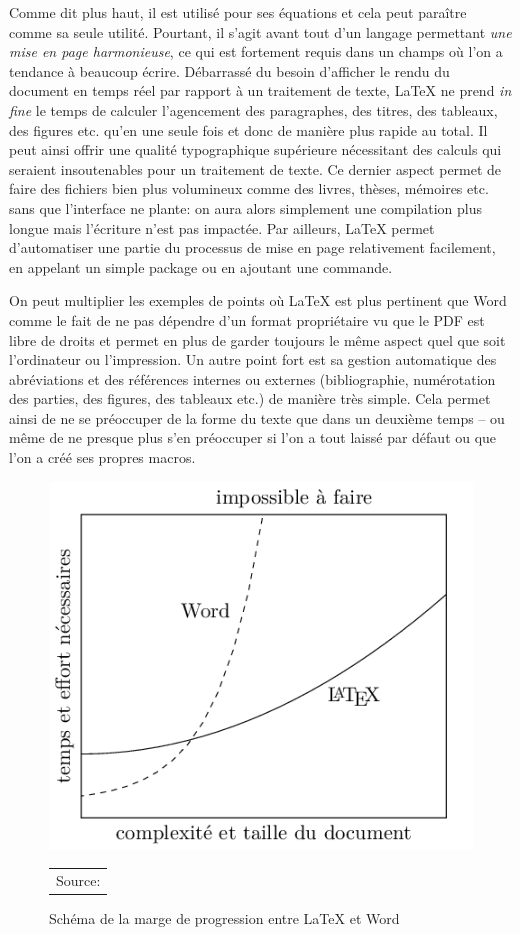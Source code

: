 \documentclass[a4paper, 11pt]{article}\usepackage[]{graphicx}\usepackage[]{xcolor}
\begin{document}
Comme dit plus haut, il est utilisé pour ses équations et cela peut paraître comme sa seule utilité. Pourtant, il s'agit avant tout d'un langage permettant \emph{une mise en page harmonieuse}, ce qui est fortement requis dans un champs où l'on a tendance à beaucoup écrire. Débarrassé du besoin d'afficher le rendu du document en temps réel par rapport à un traitement de texte, \LaTeX{} ne prend \emph{in fine} le temps de calculer l'agencement des paragraphes, des titres, des tableaux, des figures etc. qu'en une seule fois et donc de manière plus rapide au total. Il peut ainsi offrir une qualité typographique supérieure nécessitant des calculs qui seraient insoutenables pour un traitement de texte. Ce dernier aspect permet de faire des fichiers bien plus volumineux comme des livres, thèses, mémoires etc. sans que l'interface ne plante: on aura alors simplement une compilation plus longue mais l'écriture n'est pas impactée. Par ailleurs, \LaTeX{} permet d'automatiser une partie du processus de mise en page relativement facilement, en appelant un simple package ou en ajoutant une commande.

On peut multiplier les exemples de points où \LaTeX{} est plus pertinent que Word comme le fait de ne pas dépendre d'un format propriétaire vu que le PDF est libre de droits et permet en plus de garder toujours le même aspect quel que soit l'ordinateur ou l'impression. Un autre point fort est sa gestion automatique des abréviations et des références internes ou externes (bibliographie, numérotation des parties, des figures, des tableaux etc.) de manière très simple. Cela permet ainsi de ne se préoccuper de la forme du texte que dans un deuxième temps -- ou même de ne presque plus s'en préoccuper si l'on a tout laissé par défaut ou que l'on a créé ses propres macros.

\begin{figure}[h!]
  \caption{Schéma de la marge de progression entre \LaTeX{} et Word}
  \label{exemple_ref}
  \centering
  \includegraphics[scale=0.6]{Images/latex_word.png}
  \begin{tabular}{p{\textwidth}}
  Source: \cite{Peeters2013}
  \end{tabular}
\end{figure}
\end{document}

